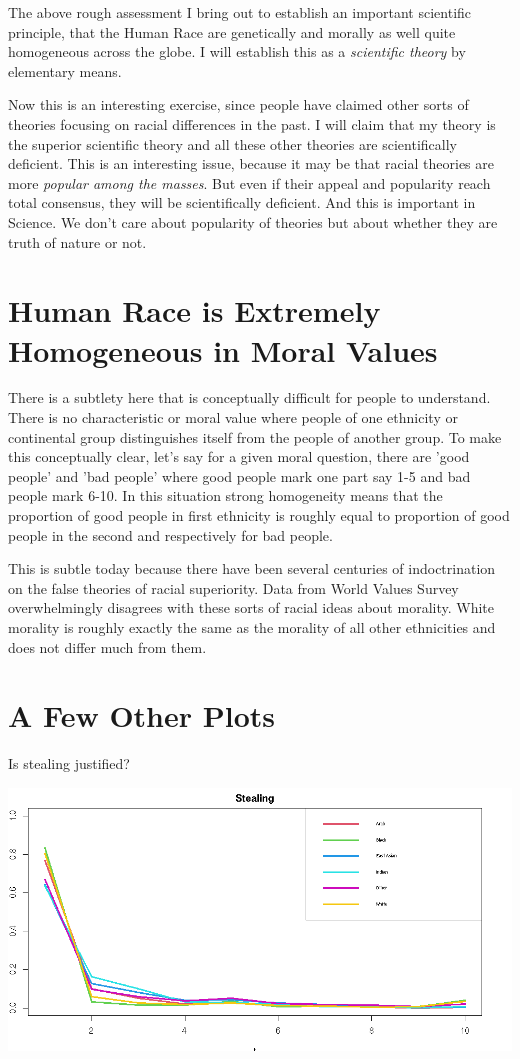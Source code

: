 \documentclass{amsart}
\begin{document}
The above rough assessment I bring out to establish an important scientific principle, that the Human Race are genetically and morally as well quite homogeneous across the globe.  I will establish this as a {\em scientific theory} by elementary means.  

Now this is an interesting exercise, since people have claimed other sorts of theories focusing on racial differences in the past.  I will claim that my theory is the superior scientific theory and all these other theories are scientifically deficient.  This is an interesting issue, because it may be that racial theories are more {\em popular among the masses}.  But even if their appeal and popularity reach total consensus, they will be scientifically deficient. And this is important in Science.  We don't care about popularity of theories but about whether they are truth of nature or not.

\section{Human Race is Extremely Homogeneous in Moral Values}

There is a subtlety here that is conceptually difficult for people to understand.  There is no characteristic or moral value where people of one ethnicity or continental group distinguishes itself from the people of another group.  To make this conceptually clear, let's say for a given moral question, there are 'good people' and 'bad people' where good people mark one part say 1-5 and bad people mark 6-10.  In this situation strong homogeneity means that the proportion of good people in first ethnicity is roughly equal to proportion of good people in the second and respectively for bad people.

This is subtle today because there have been several centuries of indoctrination on the false theories of racial superiority.  Data from World Values Survey overwhelmingly disagrees with these sorts of racial ideas about morality.  White morality is roughly exactly the same as the morality of all other ethnicities and does not differ much from them.

\section{A Few Other Plots}

Is stealing justified?

\includegraphics[scale=0.4]{jstealing.png}
\end{document}
